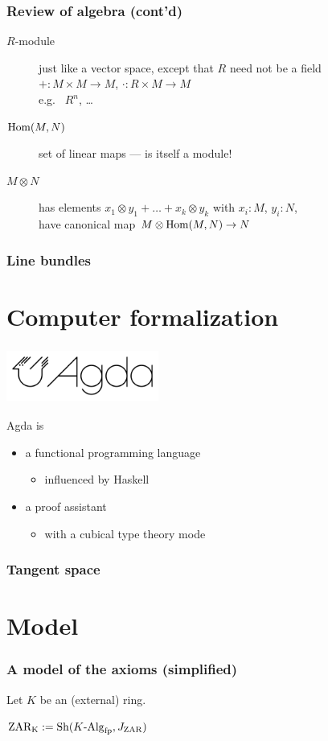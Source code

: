 \documentclass[aspectratio=1610]{beamer}
\begin{document}
\begin{frame}
  \frametitle{Review of algebra (cont'd)}

  \begin{description}
    \item[$R$-module]
      just like a vector space, except that $R$ need not be a field\\
      ${+} : M \times M \to M$, ${\cdot} : R \times M \to M$\\
      {
      e.g.\ %
      $R^n$,
      \dots}
      \pause%
    \bigskip
    \item[$\mathrm{Hom}(M, N)$]
      set of linear maps
      --- is itself a module!
      \pause%
    \bigskip
    \item[$M \otimes N$]
      has elements $x_1 \otimes y_1 + \dots + x_k \otimes y_k$ with $x_i : M$, $y_i : N$,\\
      have canonical map $M \otimes \mathrm{Hom}(M, N) \to N$
  \end{description}
\end{frame}

\begin{frame}
  \frametitle{Line bundles}
\end{frame}

\section{Computer formalization}

\begin{frame}
  \frametitle{\includegraphics[width=5cm]{./images/agda-logo.png}}

  Agda is
  \begin{itemize}
    \item
      a functional programming language
      \begin{itemize}
        \item
          influenced by Haskell
      \end{itemize}
    \item
      a proof assistant
      \begin{itemize}
        \item
          with a \alert{cubical type theory} mode
      \end{itemize}
  \end{itemize}
\end{frame}

\begin{frame}
  \frametitle{Tangent space}
\end{frame}

\section{Model}

\begin{frame}
  \frametitle{A model of the axioms (simplified)}

  Let $K$ be an (external) ring.

  \bigskip
  $\mathrm{ZAR_K} := \mathrm{Sh}(K\text{-}\mathrm{Alg}_{\mathrm{fp}}, J_{\mathrm{ZAR}})$
\end{frame}
\end{document}
